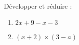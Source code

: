 
\begin{exercice}\label{exo2smath-0249}

    Développer et réduire :
        \begin{enumerate}
            \item
                \( 2x+9-x-3\)
            \item
                \( (x+2)\times (3-a)\)
        \end{enumerate}

\end{exercice}
